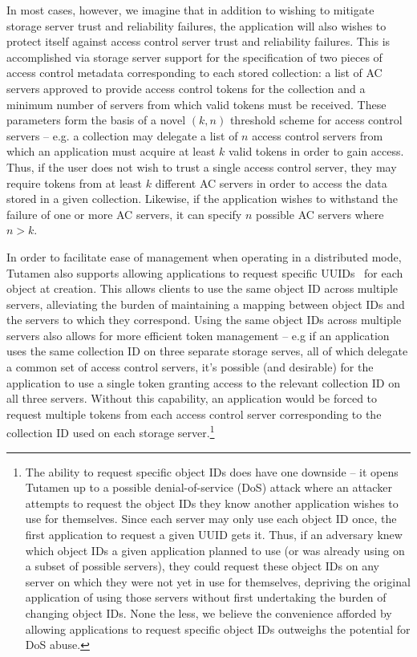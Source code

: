 In most cases, however, we imagine that in addition to wishing to
mitigate storage server trust and reliability failures, the
application will also wishes to protect itself against access control
server trust and reliability failures. This is accomplished via
storage server support for the specification of two pieces of access
control metadata corresponding to each stored collection: a list of AC
servers approved to provide access control tokens for the collection
and a minimum number of servers from which valid tokens must be
received. These parameters form the basis of a novel $(k, n)$
threshold scheme for access control servers -- e.g. a collection may
delegate a list of $n$ access control servers from which an
application must acquire at least $k$ valid tokens in order to gain
access. Thus, if the user does not wish to trust a single access
control server, they may require tokens from at least $k$ different AC
servers in order to access the data stored in a given
collection. Likewise, if the application wishes to withstand the
failure of one or more AC servers, it can specify $n$ possible AC
servers where $n > k$.

In order to facilitate ease of management when operating in a
distributed mode, Tutamen also supports allowing applications to
request specific UUIDs~\cite{leach2005} for each object at creation.
This allows clients to use the same object ID across multiple servers,
alleviating the burden of maintaining a mapping between object IDs and
the servers to which they correspond. Using the same object IDs across
multiple servers also allows for more efficient token management --
e.g if an application uses the same collection ID on three separate
storage serves, all of which delegate a common set of access control
servers, it's possible (and desirable) for the application to use a
single token granting access to the relevant collection ID on all
three servers. Without this capability, an application would be forced
to request multiple tokens from each access control server
corresponding to the collection ID used on each storage
server.\footnote{The ability to request specific object IDs does have
  one downside -- it opens Tutamen up to a possible denial-of-service
  (DoS) attack where an attacker attempts to request the object IDs
  they know another application wishes to use for themselves. Since
  each server may only use each object ID once, the first application
  to request a given UUID gets it. Thus, if an adversary knew which
  object IDs a given application planned to use (or was already using
  on a subset of possible servers), they could request these object
  IDs on any server on which they were not yet in use for themselves,
  depriving the original application of using those servers without
  first undertaking the burden of changing object IDs. None the less,
  we believe the convenience afforded by allowing applications to
  request specific object IDs outweighs the potential for DoS abuse.}



